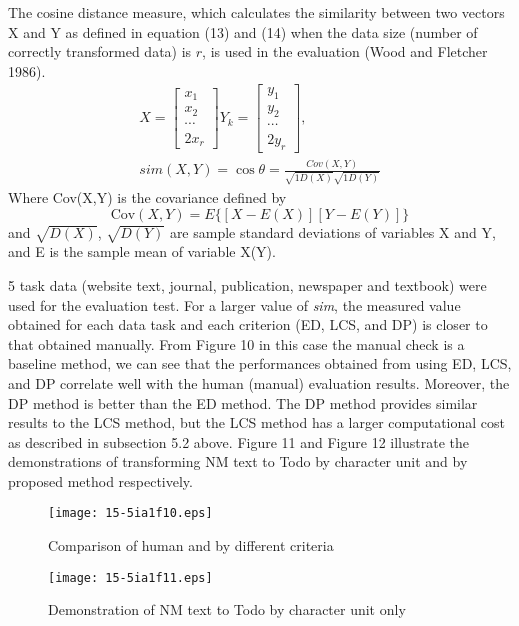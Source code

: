 \documentclass[english]{jnlp_1.4}
\begin{document}
The cosine distance measure, which calculates the similarity between two 
vectors X and Y as defined in equation (13) and (14) when the data size 
(number of correctly transformed data) is $r$, is used in the evaluation (Wood and Fletcher 1986).
\begin{gather}
 X= \begin{bmatrix}
	x_{1} \\ x_{2} \\ \cdots \\ 2x_{r}
  \end{bmatrix}
 Y_{k}= \begin{bmatrix}
	y_{1} \\ y_{2} \\ \cdots \\ 2y_{r}
  \end{bmatrix}, \\
 sim(X,Y)= \cos \theta =\frac{Cov(X,Y)}{\sqrt{1D(X)} \sqrt{1D(Y)}}
\end{gather}
Where Cov(X,Y) is the covariance defined by
\[
 \mathrm{Cov}(X,Y)=E\{[X-E(X)][Y-E(Y)]\}
\]
and $\sqrt{D(X)}$, $\sqrt{D(Y)}$ are sample standard deviations of variables X and Y, and E is the sample 
mean of variable X(Y).

5 task data (website text, journal, publication, newspaper and textbook) 
were used for the evaluation test. For a larger value of \textit{sim}, the measured 
value obtained for each data task and each criterion (ED, LCS, and DP) is 
closer to that obtained manually. From Figure 10 in this case the manual 
check is a baseline method, we can see that the performances obtained from 
using ED, LCS, and DP correlate well with the human (manual) evaluation 
results. Moreover, the DP method is better than the ED method. The DP method 
provides similar results to the LCS method, but the LCS method has a larger 
computational cost as described in subsection 5.2 above. Figure 11 and 
Figure 12 illustrate the demonstrations of transforming NM text to Todo by 
character unit and by proposed method respectively.

\begin{figure}[t]
\centerline{\texttt{[image: 15-5ia1f10.eps]}}
\caption{Comparison of human and by different criteria}
\label{fig37}
\end{figure}
\begin{figure}[t]
\centerline{\texttt{[image: 15-5ia1f11.eps]}}
\caption{Demonstration of NM text to Todo by character unit only}
\label{fig38}
\vspace{-1\baselineskip}
\end{figure}
\end{document}
